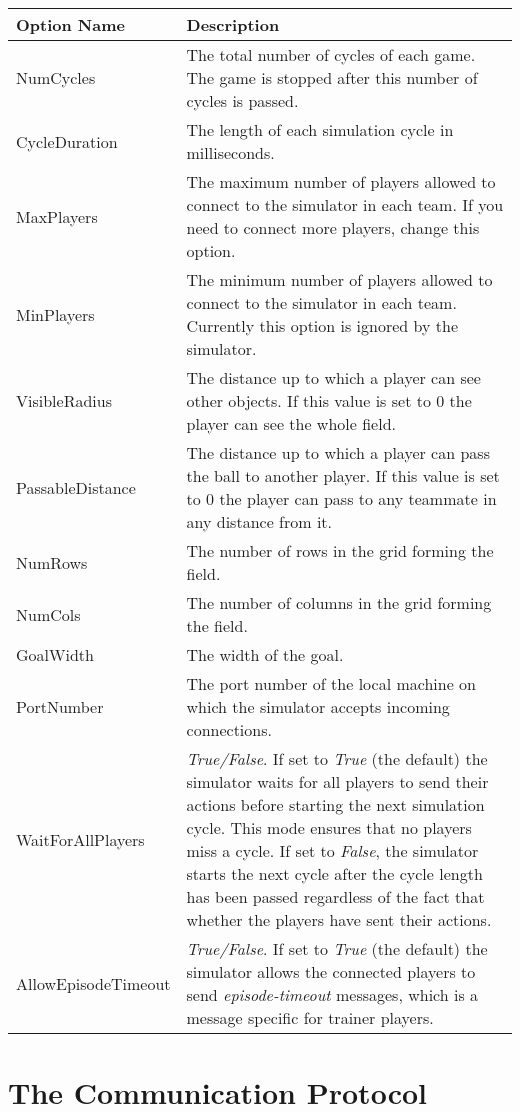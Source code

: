 \documentclass[12pt,titlepage,a4paper]{article}
\begin{document}
\begin{tabular}{l|p{9cm}}
Option Name & Description \\ \hline
NumCycles & The total number of cycles of each game. The game is stopped after this number of cycles is passed. \\
CycleDuration & The length of each simulation cycle in milliseconds. \\
MaxPlayers & The maximum number of players allowed to connect to the simulator in each team. If you need to connect more players, change this option.\\
MinPlayers & The minimum number of players allowed to connect to the simulator in each team. Currently this option is ignored by the simulator. \\
VisibleRadius & The distance up to which a player can see other objects. If this value is set to $0$ the player can see the whole field. \\
PassableDistance & The distance up to which a player can pass the ball to another player. If this value is set to $0$ the player can pass to any teammate in any distance from it. \\
NumRows & The number of rows in the grid forming the field. \\
NumCols & The number of columns in the grid forming the field. \\
GoalWidth & The width of the goal. \\
PortNumber & The port number of the local machine on which the simulator accepts incoming connections. \\
WaitForAllPlayers & \emph{True/False}. If set to \emph{True} (the default) the simulator waits for all players to send their actions before starting the next simulation cycle. This mode ensures that no players miss a cycle. If set to \emph{False}, the simulator starts the next cycle after the cycle length has been passed regardless of the fact that whether the players have sent their actions. \\
AllowEpisodeTimeout & \emph{True/False}. If set to \emph{True} (the default) the simulator allows the connected players to send \emph{episode-timeout} messages, which is a message specific for trainer players.
\end{tabular}
\vspace{1cm}



\section{The Communication Protocol}
\end{document}
